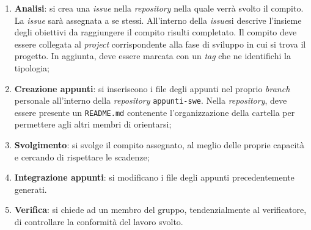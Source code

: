 \begin{enumerate}
	\item \textbf{Analisi}: si crea una \textit{issue\g} nella \textit{repository\g}
	      nella quale verrà svolto il compito. La \textit{issue\g} sarà assegnata
	      a se stessi. All'interno della \textit{issue}\g si descrive l'insieme degli
	      obiettivi da raggiungere il compito risulti completato.
	      Il compito deve essere collegata al \textit{project} corrispondente
	      alla fase di sviluppo in cui si trova il progetto. In aggiunta, deve
	      essere marcata con un \textit{tag} che ne identifichi la tipologia;

	\item \textbf{Creazione appunti}: si inseriscono i file degli
	      appunti nel proprio \textit{branch} personale all'interno
	      della \textit{repository\g} \texttt{appunti-swe}.
	      Nella \textit{repository\g}, deve essere presente un \texttt{README.md}
	      contenente l'organizzazione della cartella per permettere agli altri
	      membri di orientarsi;

	\item \textbf{Svolgimento}: si svolge il compito assegnato, al meglio
	      delle proprie capacità e cercando di rispettare le scadenze;

	\item \textbf{Integrazione appunti}: si modificano i file degli
	      appunti precedentemente generati.

	\item \textbf{Verifica}: si chiede ad un membro del gruppo,
	      tendenzialmente al verificatore, di controllare la conformità del
	      lavoro svolto.
\end{enumerate}

